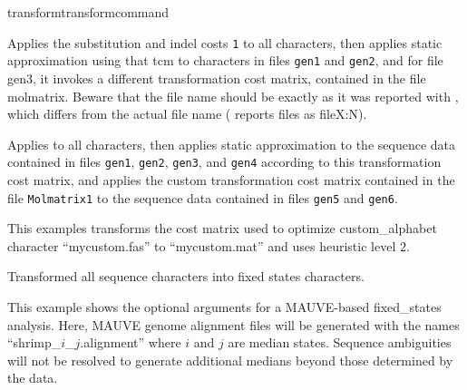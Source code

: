 \begin{command}{transform}{transformcommand}
\begin{poyexamples}
		

            	{Applies the substitution and indel costs \texttt{1} to all characters, then applies static approximation
            	using that tcm to characters in files \texttt{gen1} and \texttt{gen2}, and for file
            	gen3, it invokes a different transformation cost matrix, contained
            	in the file molmatrix. Beware that the file name should be exactly
            	as it was reported with , which differs from the actual
            	file name ( reports files as fileX:N).}

            	{Applies  to all characters, then applies
            	static approximation to the sequence data contained in files \texttt{gen1}, \texttt{gen2},
            	\texttt{gen3}, and \texttt{gen4} according to this transformation cost
            	matrix, and applies the custom transformation cost matrix contained in the file
            	\texttt{Molmatrix1} to the sequence data contained in files \texttt{gen5} and
            	\texttt{gen6}.}
         
		{This examples transforms the cost matrix used to optimize custom\_alphabet 
		character ``mycustom.fas'' to ``mycustom.mat'' and uses heuristic level $2$.}
         
        		 {Transformed all sequence characters into fixed states characters.}
		 
		{This example shows the optional arguments for a MAUVE-based fixed\_states analysis.
		Here, MAUVE genome alignment files will be generated with the names ``shrimp\_$i$\_$j$.alignment'' 
		where $i$ and $j$ are median states.  Sequence ambiguities will not be resolved to generate 
		additional medians beyond those determined by the
		data.}
		

\end{poyexamples}
\end{command}
